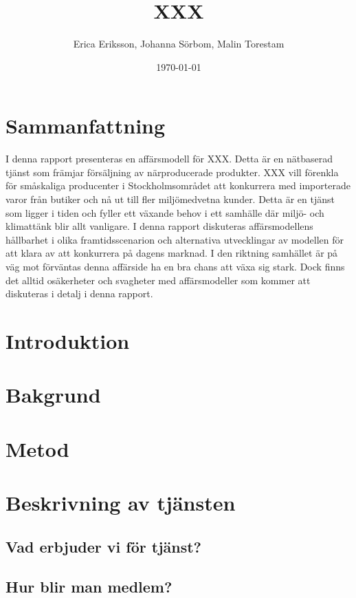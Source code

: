 \documentclass[10pt,a4paper,oneside]{article}
\title{XXX}
\author{Erica Eriksson, Johanna Sörbom, Malin Torestam}
\date{\today}
\begin{document}
\maketitle
\newpage

\section{Sammanfattning}
I denna rapport presenteras en affärsmodell för XXX. Detta är en nätbaserad tjänst som främjar försäljning av närproducerade produkter. XXX vill förenkla för småskaliga producenter i Stockholmsområdet att konkurrera med importerade varor från butiker och nå ut till fler miljömedvetna kunder. Detta är en tjänst som ligger i tiden och fyller ett växande behov i ett samhälle där miljö- och klimattänk blir allt vanligare. I denna rapport diskuteras affärsmodellens hållbarhet i olika framtidsscenarion och alternativa utvecklingar av modellen för att klara av att konkurrera på dagens marknad. I den riktning samhället är på väg mot förväntas denna affärside ha en bra chans att växa sig stark. Dock finns det alltid osäkerheter och svagheter med affärsmodeller som kommer att diskuteras i detalj i denna rapport. 
\newpage

\tableofcontents
\newpage

\section{Introduktion}
\newpage

\section{Bakgrund}
\newpage

\section{Metod}
\newpage

\section{Beskrivning av tjänsten}
\subsection{Vad erbjuder vi för tjänst?}
\subsection{Hur blir man medlem?}
\end{document}
